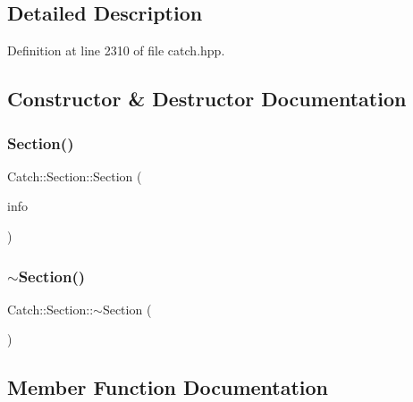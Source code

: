 \subsection{Detailed Description}


Definition at line 2310 of file catch.\+hpp.



\subsection{Constructor \& Destructor Documentation}
\hypertarget{class_catch_1_1_section_a68fd4e51e8981aaa7ddb00d8a6abd099}{}\label{class_catch_1_1_section_a68fd4e51e8981aaa7ddb00d8a6abd099} 
\subsubsection{\texorpdfstring{Section()}{Section()}}
{\footnotesize\ttfamily Catch\+::\+Section\+::\+Section (\begin{DoxyParamCaption}\item[{\hyperlink{struct_catch_1_1_section_info}{Section\+Info} const \&}]{info }\end{DoxyParamCaption})}

\hypertarget{class_catch_1_1_section_aa1422edd68a77aa578b5cc6b8b69f86f}{}\label{class_catch_1_1_section_aa1422edd68a77aa578b5cc6b8b69f86f} 
\subsubsection{\texorpdfstring{$\sim$\+Section()}{~Section()}}
{\footnotesize\ttfamily Catch\+::\+Section\+::$\sim$\+Section (\begin{DoxyParamCaption}{ }\end{DoxyParamCaption})}



\subsection{Member Function Documentation}
\hypertarget{class_catch_1_1_section_a0632b804dcea1417a2970620a9742eb3}{}\label{class_catch_1_1_section_a0632b804dcea1417a2970620a9742eb3} 
